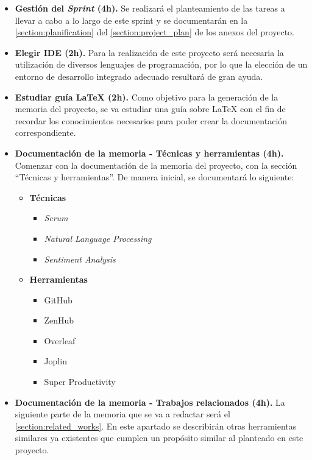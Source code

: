 \begin{itemize}
    \item \textbf{Gestión del \textit{Sprint} (4h).}  Se realizará el planteamiento de las tareas a llevar a cabo a lo largo de este sprint y se documentarán en la \autoref{section:planification} del \autoref{section:project_plan} de los anexos del proyecto.

    \item \textbf{Elegir IDE (2h).} Para la realización de este proyecto será necesaria la utilización de diversos lenguajes de programación, por lo que la elección de un entorno de desarrollo integrado adecuado resultará de gran ayuda.

    \item \textbf{Estudiar guía \LaTeX{} (2h).} Como objetivo para la generación de la memoria del proyecto, se va estudiar una guía sobre \LaTeX{} con el fin de recordar los conocimientos necesarios para poder crear la documentación correspondiente.
 
    \item \textbf{Documentación de la memoria - Técnicas y herramientas (4h).} Comenzar con la documentación de la memoria del proyecto, con la sección ``Técnicas y herramientas''. De manera inicial, se documentará lo siguiente:

    \begin{itemize}
        \item \textbf{Técnicas}
        \begin{itemize}
            \item \textit{Scrum}
            \item \textit{Natural Language Processing}
            \item \textit{Sentiment Analysis}
        \end{itemize}
        \item \textbf{Herramientas}
        \begin{itemize}
            \item GitHub
            \item ZenHub
            \item Overleaf
            \item Joplin
            \item Super Productivity
        \end{itemize}
    \end{itemize}
    
    \item \textbf{Documentación de la memoria - Trabajos relacionados (4h).} La siguiente parte de la memoria que se va a redactar será el \autoref{section:related_works}. En este apartado se describirán otras herramientas similares ya existentes que cumplen un propósito similar al planteado en este proyecto.
    

\end{itemize}

